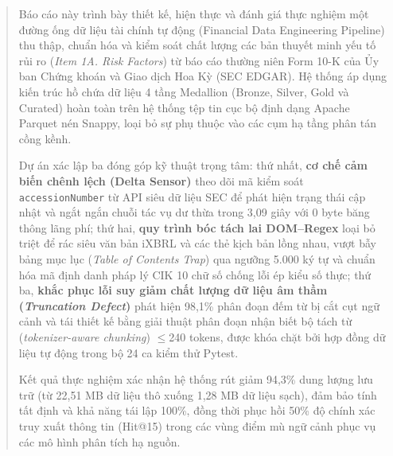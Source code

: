 \begin{abstract}
Báo cáo này trình bày thiết kế, hiện thực và đánh giá thực nghiệm một đường ống dữ liệu tài chính tự động (Financial Data Engineering Pipeline) thu thập, chuẩn hóa và kiểm soát chất lượng các bản thuyết minh yếu tố rủi ro (\textit{Item 1A. Risk Factors}) từ báo cáo thường niên Form 10-K của Ủy ban Chứng khoán và Giao dịch Hoa Kỳ (SEC EDGAR). Hệ thống áp dụng kiến trúc hồ chứa dữ liệu 4 tầng Medallion (Bronze, Silver, Gold và Curated) hoàn toàn trên hệ thống tệp tin cục bộ định dạng Apache Parquet nén Snappy, loại bỏ sự phụ thuộc vào các cụm hạ tầng phân tán cồng kềnh.

Dự án xác lập ba đóng góp kỹ thuật trọng tâm: thứ nhất, \textbf{cơ chế cảm biến chênh lệch (Delta Sensor)} theo dõi mã kiểm soát \texttt{accessionNumber} từ API siêu dữ liệu SEC để phát hiện trạng thái cập nhật và ngắt ngắn chuỗi tác vụ dư thừa trong 3,09 giây với 0 byte băng thông lãng phí; thứ hai, \textbf{quy trình bóc tách lai DOM--Regex} loại bỏ triệt để rác siêu văn bản iXBRL và các thẻ kịch bản lồng nhau, vượt bẫy bảng mục lục (\textit{Table of Contents Trap}) qua ngưỡng 5.000 ký tự và chuẩn hóa mã định danh pháp lý CIK 10 chữ số chống lỗi ép kiểu số thực; thứ ba, \textbf{khắc phục lỗi suy giảm chất lượng dữ liệu âm thầm (\textit{Truncation Defect})} phát hiện 98,1\% phân đoạn đếm từ bị cắt cụt ngữ cảnh và tái thiết kế bằng giải thuật phân đoạn nhận biết bộ tách từ (\textit{tokenizer-aware chunking}) $\le$240 tokens, được khóa chặt bởi hợp đồng dữ liệu tự động trong bộ 24 ca kiểm thử Pytest.

Kết quả thực nghiệm xác nhận hệ thống rút giảm 94,3\% dung lượng lưu trữ (từ 22,51 MB dữ liệu thô xuống 1,28 MB dữ liệu sạch), đảm bảo tính tất định và khả năng tái lập 100\%, đồng thời phục hồi 50\% độ chính xác truy xuất thông tin (Hit@15) trong các vùng điểm mù ngữ cảnh phục vụ các mô hình phân tích hạ nguồn.
\end{abstract}
